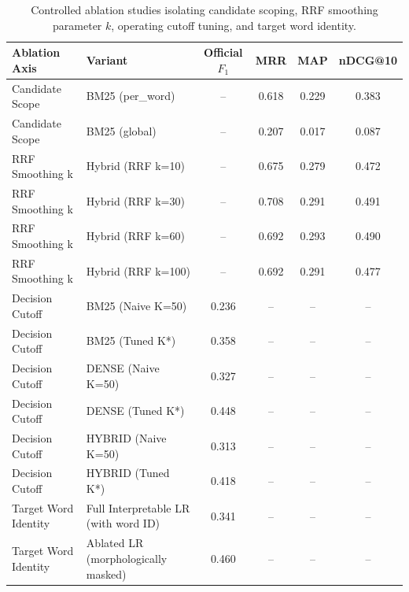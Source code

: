 \begin{table}[t]
\centering
\small
\begin{tabular}{llcccc}
\toprule
\textbf{Ablation Axis} & \textbf{Variant} & \textbf{Official $F_1$} & \textbf{MRR} & \textbf{MAP} & \textbf{nDCG@10} \\
\midrule
Candidate Scope & BM25 (per_word) & -- & 0.618 & 0.229 & 0.383 \\
Candidate Scope & BM25 (global) & -- & 0.207 & 0.017 & 0.087 \\
RRF Smoothing k & Hybrid (RRF k=10) & -- & 0.675 & 0.279 & 0.472 \\
RRF Smoothing k & Hybrid (RRF k=30) & -- & 0.708 & 0.291 & 0.491 \\
RRF Smoothing k & Hybrid (RRF k=60) & -- & 0.692 & 0.293 & 0.490 \\
RRF Smoothing k & Hybrid (RRF k=100) & -- & 0.692 & 0.291 & 0.477 \\
Decision Cutoff & BM25 (Naive K=50) & 0.236 & -- & -- & -- \\
Decision Cutoff & BM25 (Tuned K*) & 0.358 & -- & -- & -- \\
Decision Cutoff & DENSE (Naive K=50) & 0.327 & -- & -- & -- \\
Decision Cutoff & DENSE (Tuned K*) & 0.448 & -- & -- & -- \\
Decision Cutoff & HYBRID (Naive K=50) & 0.313 & -- & -- & -- \\
Decision Cutoff & HYBRID (Tuned K*) & 0.418 & -- & -- & -- \\
Target Word Identity & Full Interpretable LR (with word ID) & 0.341 & -- & -- & -- \\
Target Word Identity & Ablated LR (morphologically masked) & 0.460 & -- & -- & -- \\
\bottomrule
\end{tabular}
\caption{Controlled ablation studies isolating candidate scoping, RRF smoothing parameter $k$, operating cutoff tuning, and target word identity.}
\label{tab:ablation_summary}
\end{table}